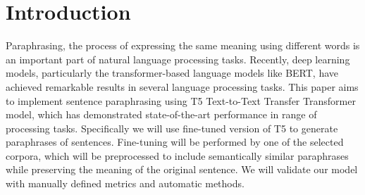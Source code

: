 \documentclass[fleqn,moreauthors,10pt]{ds_report}
\affiliation{\textit{Advisors: Slavko Žitnik}}
\begin{document}
\flushbottom 

\maketitle 

\thispagestyle{empty} 


\section*{Introduction}
	
Paraphrasing, the process of expressing the same meaning using different words is an important part of natural language processing tasks. Recently, deep learning models, particularly the transformer-based language models like BERT, have achieved remarkable results in several language processing tasks. This paper aims to implement sentence paraphrasing using T5 Text-to-Text Transfer Transformer model, which has demonstrated state-of-the-art performance in range of processing tasks. Specifically we will use fine-tuned version of T5 \cite{ulčar2023sequence} to generate paraphrases of sentences. Fine-tuning will be performed by one of the selected corpora, which will be preprocessed to include semantically similar paraphrases while preserving the meaning of the original sentence. We will validate our model with manually defined metrics and automatic methods. 
\end{document}
